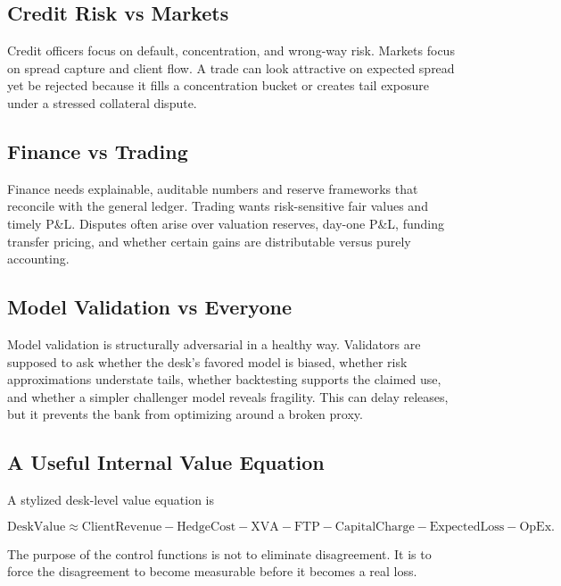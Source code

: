 \documentclass{apex_mdd}
\begin{document}
\subsection{Credit Risk vs Markets}

Credit officers focus on default, concentration, and wrong-way risk. Markets focus on spread capture and client flow. A trade can look attractive on expected spread yet be rejected because it fills a concentration bucket or creates tail exposure under a stressed collateral dispute.

\subsection{Finance vs Trading}

Finance needs explainable, auditable numbers and reserve frameworks that reconcile with the general ledger. Trading wants risk-sensitive fair values and timely P\&L. Disputes often arise over valuation reserves, day-one P\&L, funding transfer pricing, and whether certain gains are distributable versus purely accounting.

\subsection{Model Validation vs Everyone}

Model validation is structurally adversarial in a healthy way. Validators are supposed to ask whether the desk's favored model is biased, whether risk approximations understate tails, whether backtesting supports the claimed use, and whether a simpler challenger model reveals fragility. This can delay releases, but it prevents the bank from optimizing around a broken proxy.

\subsection{A Useful Internal Value Equation}

A stylized desk-level value equation is
\begin{formulabox}
\[
  \mathrm{DeskValue}
  \approx
  \mathrm{ClientRevenue}
  - \mathrm{HedgeCost}
  - \mathrm{XVA}
  - \mathrm{FTP}
  - \mathrm{CapitalCharge}
  - \mathrm{ExpectedLoss}
  - \mathrm{OpEx}.
\]
\end{formulabox}

The purpose of the control functions is not to eliminate disagreement. It is to force the disagreement to become measurable before it becomes a real loss.
\end{document}
